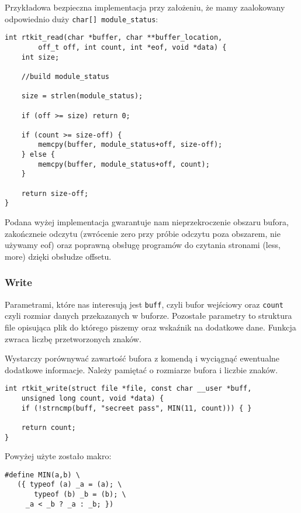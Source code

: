 \documentclass[a4paper]{article}
\begin{document}
Przykładowa bezpieczna implementacja przy założeniu, że mamy zaalokowany
odpowiednio duży \texttt{char[] module\_status}:
\begin{verbatim}
int rtkit_read(char *buffer, char **buffer_location,
        off_t off, int count, int *eof, void *data) {
	int size;
	
	//build module_status
	
	size = strlen(module_status);

	if (off >= size) return 0;
  
	if (count >= size-off) {
		memcpy(buffer, module_status+off, size-off);
	} else {
		memcpy(buffer, module_status+off, count);
	}
  
	return size-off;
}
\end{verbatim}
Podana wyżej implementacja gwarantuje nam nieprzekroczenie obszaru bufora,
zakończneie odczytu (zwrócenie zero przy próbie odczytu poza obszarem, nie używamy eof)
oraz poprawną obsługę programów do czytania stronami (less, more) dzięki obsłudze offsetu.

\subsubsection{Write}
Parametrami, które nas interesują jest \texttt{buff}, czyli bufor wejściowy
oraz \texttt{count} czyli rozmiar danych przekazanych w buforze. Pozostałe
parametry to struktura file opisująca plik do którego piszemy oraz wskaźnik na
dodatkowe dane. Funkcja zwraca liczbę przetworzonych znaków.

Wystarczy porównywać zawartość bufora z komendą i wyciągnąć ewentualne
dodatkowe informacje. Należy pamiętać o rozmiarze bufora i liczbie znaków.
\begin{verbatim}
int rtkit_write(struct file *file, const char __user *buff,
    unsigned long count, void *data) {
	if (!strncmp(buff, "secreet pass", MIN(11, count))) { }
	
	return count;
}
\end{verbatim}

Powyżej użyte zostało makro:
\begin{verbatim}
#define MIN(a,b) \
   ({ typeof (a) _a = (a); \
       typeof (b) _b = (b); \
     _a < _b ? _a : _b; })
\end{verbatim}     
\end{document}
